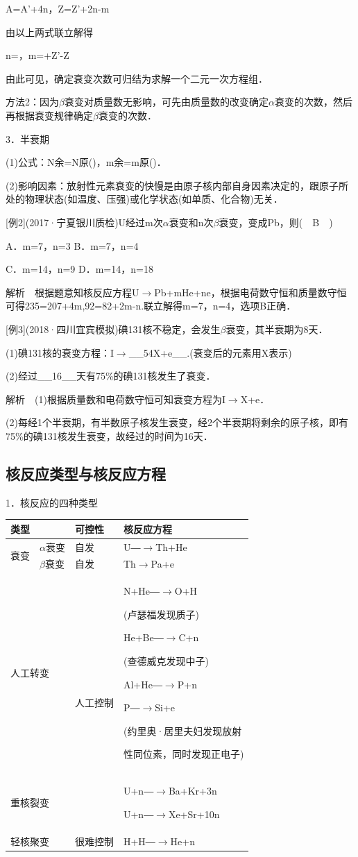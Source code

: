 A=A'+4n，Z=Z'+2n-m

由以上两式联立解得

n=，m=+Z'-Z

由此可见，确定衰变次数可归结为求解一个二元一次方程组．

方法2：因为$\beta$衰变对质量数无影响，可先由质量数的改变确定$\alpha$衰变的次数，然后再根据衰变规律确定$\beta$衰变的次数．

3．半衰期

(1)公式：N余=N原()，m余=m原()．

(2)影响因素：放射性元素衰变的快慢是由原子核内部自身因素决定的，跟原子所处的物理状态(如温度、压强)或化学状态(如单质、化合物)无关．

{[}例2{]}(2017·宁夏银川质检)U经过m次$\alpha$衰变和n次$\beta$衰变，变成Pb，则(　B　)

A．m=7，n=3 B．m=7，n=4

C．m=14，n=9 D．m=14，n=18

解析　根据题意知核反应方程U$\rightarrow$Pb+mHe+ne，根据电荷数守恒和质量数守恒可得235=207+4m,92=82+2m-n.联立解得m=7，n=4，选项B正确．

{[}例3{]}(2018·四川宜宾模拟)碘131核不稳定，会发生$\beta$衰变，其半衰期为8天．

(1)碘131核的衰变方程：I$\rightarrow$\_\_54X+e\_\_.(衰变后的元素用X表示)

(2)经过\_\_16\_\_天有75\%的碘131核发生了衰变．

解析　(1)根据质量数和电荷数守恒可知衰变方程为I$\rightarrow$X+e．

(2)每经1个半衰期，有半数原子核发生衰变，经2个半衰期将剩余的原子核，即有75\%的碘131核发生衰变，故经过的时间为16天．
\newpage
\subsection{核反应类型与核反应方程}

1．核反应的四种类型

\begin{longtable}[]{@{}m{1cm}m{1cm}m{2cm}m{5cm}@{}}
\toprule
\multicolumn{2}{l}{类型}& 可控性 & 核反应方程 \tabularnewline
\midrule
\endhead
\multirow{2}{2cm}{衰变}
&
$\alpha$衰变
&
自发
&
U―$\rightarrow$Th+He\strut
\tabularnewline
& $\beta$衰变 & 自发 & Th$\rightarrow$Pa+e\tabularnewline
\multicolumn{2}{l}{人工转变}
&
\multirow{2}{2cm}{人工控制}    
&
N+He―$\rightarrow$O+H

(卢瑟福发现质子)

He+Be―$\rightarrow$C+n

(查德威克发现中子)

Al+He―$\rightarrow$P+n

P―$\rightarrow$Si+e

(约里奥·居里夫妇发现放射

性同位素，同时发现正电子)
\tabularnewline
\multicolumn{2}{l}{重核裂变}
& &
U+n―$\rightarrow$Ba+Kr+3n

U+n―$\rightarrow$Xe+Sr+10n
\tabularnewline
\multicolumn{2}{l}{轻核聚变}
& 很难控制 & H+H―$\rightarrow$He+n \tabularnewline
\bottomrule
\end{longtable}

